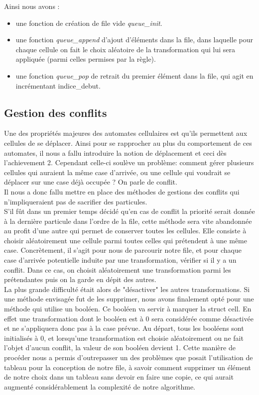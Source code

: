 \documentclass[11pt, a4paper]{article}
\begin{document}
\noindent Ainsi nous avons : 
\begin{itemize}
    \item une fonction de création de file vide \textit{queue\_init}.
    \item  une fonction \textit{queue\_append} d'ajout d'éléments dans la file, dans laquelle pour chaque cellule on fait le choix aléatoire de la transformation qui lui sera appliquée (parmi celles permises par la règle).
    \item une fonction \textit{queue\_pop} de retrait du premier élément dans la file, qui agit en incrémentant indice\_debut.
\end{itemize}


\subsection{Gestion des conflits}

\label{GC}
Une des propriétés majeures des automates cellulaires est qu'ils permettent aux cellules de se déplacer. Ainsi pour se rapprocher au plus du comportement de ces automates, il nous a fallu introduire la notion de déplacement et ceci dès l'achievement 2. Cependant celle-ci soulève un problème: comment gérer plusieurs cellules qui auraient la même case d'arrivée, ou une cellule qui voudrait se déplacer sur une case déjà occupée ? On parle de conflit.\\


Il nous a donc fallu mettre en place des méthodes de gestions des conflits qui n'impliqueraient pas de sacrifier des particules. \\

S'il fût dans un premier temps décidé qu'en cas de conflit la priorité serait donnée à la dernière particule dans l'ordre de la file, cette méthode sera vite abandonnée au profit d'une autre qui permet de conserver toutes les cellules. Elle consiste à choisir aléatoirement une cellule parmi toutes celles qui prétendent à une même case. Concrètement, il s'agit pour nous de parcourir notre file, et pour chaque case d'arrivée potentielle induite par une transformation, vérifier si il y a un conflit. Dans ce cas, on choisit aléatoirement une transformation parmi les prétendantes puis on la garde en dépit des autres. \\

La plus grande difficulté était alors de "désactiver" les autres transformations. Si une méthode envisagée fut de les supprimer, nous avons finalement opté pour une méthode qui utilise un booléen. Ce booléen va servir à marquer la struct cell. En effet une transformation dont le booléen est à 0 sera considérée comme désactivée et ne s'appliquera donc pas à la case prévue. Au départ, tous les booléens sont initialisés à 0, et lorsqu'une transformation est choisie aléatoirement ou ne fait l'objet d'aucun conflit, la valeur de son booléen devient 1. Cette manière de procéder nous a permis d'outrepasser un des problèmes que posait l'utilisation de tableau pour la conception de notre file, à savoir comment supprimer un élément de notre choix dans un tableau sans devoir en faire une copie, ce qui aurait augmenté considérablement la complexité de notre algorithme.
\end{document}
